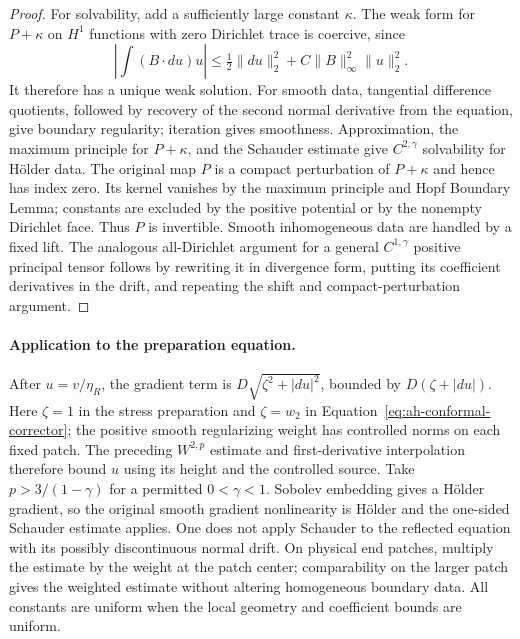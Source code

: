 \begin{proof}
For solvability, add a sufficiently large constant $\kappa$.
The weak form for $P+\kappa$ on $H^1$ functions with zero Dirichlet
trace is coercive, since
\[
 \left|\int(B\cdot du)u\right|
 \le\tfrac12\|du\|_2^2+C\|B\|_\infty^2\|u\|_2^2.
\]
It therefore has a unique weak solution. For smooth data, tangential
difference quotients, followed by recovery of the second normal
derivative from the equation, give boundary regularity; iteration
gives smoothness. Approximation, the maximum principle for
$P+\kappa$, and the Schauder estimate give $C^{2,\gamma}$ solvability
for H\"older data. The original map $P$ is a compact perturbation of
$P+\kappa$ and hence has index zero. Its kernel vanishes by the
maximum principle and Hopf Boundary Lemma; constants are excluded by
the positive potential or by the nonempty Dirichlet face. Thus $P$
is invertible. Smooth inhomogeneous data are handled by a fixed lift.
The analogous all-Dirichlet argument for a general $C^{1,\gamma}$
positive principal tensor follows by rewriting it in divergence form,
putting its coefficient derivatives in the drift, and repeating the
shift and compact-perturbation argument.
\end{proof}

\paragraph{Application to the preparation equation.}
After $u=v/\eta_R$, the gradient term is
$D\sqrt{\zeta^2+|du|^2}$, bounded by $D(\zeta+|du|)$.
Here $\zeta=1$ in the stress preparation and $\zeta=w_2$ in
Equation~\eqref{eq:ah-conformal-corrector}; the positive smooth
regularizing weight has controlled norms on each fixed patch.
The preceding $W^{2,p}$ estimate and first-derivative interpolation
therefore bound $u$ using its height and the controlled source.
Take $p>3/(1-\gamma)$ for a permitted $0<\gamma<1$.
Sobolev embedding gives a H\"older gradient, so the original smooth
gradient nonlinearity is H\"older and the one-sided Schauder estimate
applies. One does not apply Schauder to the reflected equation with
its possibly discontinuous normal drift. On physical end patches,
multiply the estimate by the weight at the patch center; comparability
on the larger patch gives the weighted estimate without altering
homogeneous boundary data. All constants are uniform when the local
geometry and coefficient bounds are uniform.
